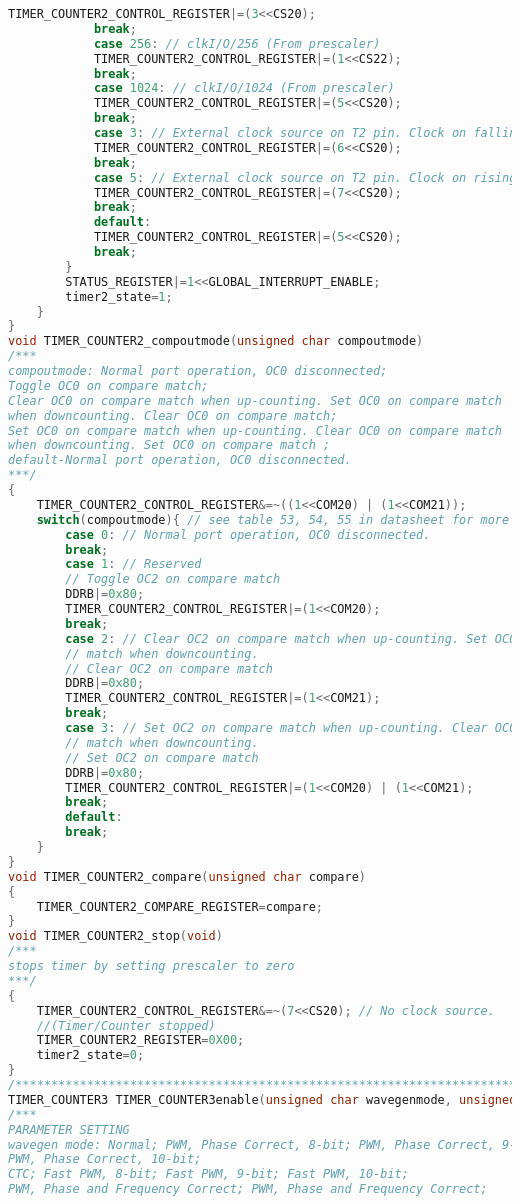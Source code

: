 \begin{lstlisting}[language=C, caption={atmega128timer.c}, label=atmega128timer-c, captionpos=b]
			TIMER_COUNTER2_CONTROL_REGISTER|=(3<<CS20);
			break;
			case 256: // clkI/O/256 (From prescaler)
			TIMER_COUNTER2_CONTROL_REGISTER|=(1<<CS22);
			break;
			case 1024: // clkI/O/1024 (From prescaler)
			TIMER_COUNTER2_CONTROL_REGISTER|=(5<<CS20);
			break;
			case 3: // External clock source on T2 pin. Clock on falling edge
			TIMER_COUNTER2_CONTROL_REGISTER|=(6<<CS20);
			break;
			case 5: // External clock source on T2 pin. Clock on rising edge
			TIMER_COUNTER2_CONTROL_REGISTER|=(7<<CS20);
			break;
			default:
			TIMER_COUNTER2_CONTROL_REGISTER|=(5<<CS20);
			break;
		}
		STATUS_REGISTER|=1<<GLOBAL_INTERRUPT_ENABLE;
		timer2_state=1;
	}	
}
void TIMER_COUNTER2_compoutmode(unsigned char compoutmode)
/***
compoutmode: Normal port operation, OC0 disconnected;
Toggle OC0 on compare match; 
Clear OC0 on compare match when up-counting. Set OC0 on compare match
when downcounting. Clear OC0 on compare match;
Set OC0 on compare match when up-counting. Clear OC0 on compare match
when downcounting. Set OC0 on compare match ;
default-Normal port operation, OC0 disconnected.
***/
{
	TIMER_COUNTER2_CONTROL_REGISTER&=~((1<<COM20) | (1<<COM21));
	switch(compoutmode){ // see table 53, 54, 55 in datasheet for more information
		case 0: // Normal port operation, OC0 disconnected.
		break;
		case 1: // Reserved
		// Toggle OC2 on compare match
		DDRB|=0x80;
		TIMER_COUNTER2_CONTROL_REGISTER|=(1<<COM20);
		break;
		case 2: // Clear OC2 on compare match when up-counting. Set OC0 on compare
		// match when downcounting.
		// Clear OC2 on compare match
		DDRB|=0x80;
		TIMER_COUNTER2_CONTROL_REGISTER|=(1<<COM21);
		break;
		case 3: // Set OC2 on compare match when up-counting. Clear OC0 on compare
		// match when downcounting.
		// Set OC2 on compare match
		DDRB|=0x80;
		TIMER_COUNTER2_CONTROL_REGISTER|=(1<<COM20) | (1<<COM21);
		break;
		default:
		break;
	}
}
void TIMER_COUNTER2_compare(unsigned char compare)
{
	TIMER_COUNTER2_COMPARE_REGISTER=compare;
}
void TIMER_COUNTER2_stop(void)
/***
stops timer by setting prescaler to zero
***/
{
	TIMER_COUNTER2_CONTROL_REGISTER&=~(7<<CS20); // No clock source.
	//(Timer/Counter stopped)
	TIMER_COUNTER2_REGISTER=0X00;
	timer2_state=0;
}
/*****************************************************************************************/
TIMER_COUNTER3 TIMER_COUNTER3enable(unsigned char wavegenmode, unsigned char interrupt)
/***
PARAMETER SETTING
wavegen mode: Normal; PWM, Phase Correct, 8-bit; PWM, Phase Correct, 9-bit;
PWM, Phase Correct, 10-bit;
CTC; Fast PWM, 8-bit; Fast PWM, 9-bit; Fast PWM, 10-bit;
PWM, Phase and Frequency Correct; PWM, Phase and Frequency Correct;

\end{lstlisting}
